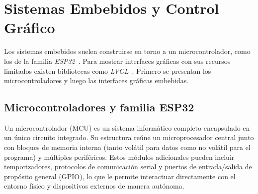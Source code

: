 %
%
%
%
%
%
%
%


\section{Sistemas Embebidos y Control Gráfico}

Los sistemas embebidos suelen construirse en torno a un microcontrolador, como los de la familia \emph{ESP32}~\cite{esp32_datasheet}. Para mostrar interfaces gráficas con sus recursos limitados existen bibliotecas como \emph{LVGL}~\cite{lvgl}. Primero se presentan los microcontroladores y luego las interfaces gráficas embebidas. 

\subsection{Microcontroladores y familia ESP32}

Un microcontrolador (MCU) es un sistema informático completo encapsulado en un único circuito integrado. Su estructura reúne un microprocesador central junto con bloques de memoria interna (tanto volátil para datos como no volátil para el programa) y múltiples periféricos. Estos módulos adicionales pueden incluir temporizadores, protocolos de comunicación serial y puertos de entrada/salida de propósito general (GPIO), lo que le permite interactuar directamente con el entorno físico y dispositivos externos de manera autónoma. 

